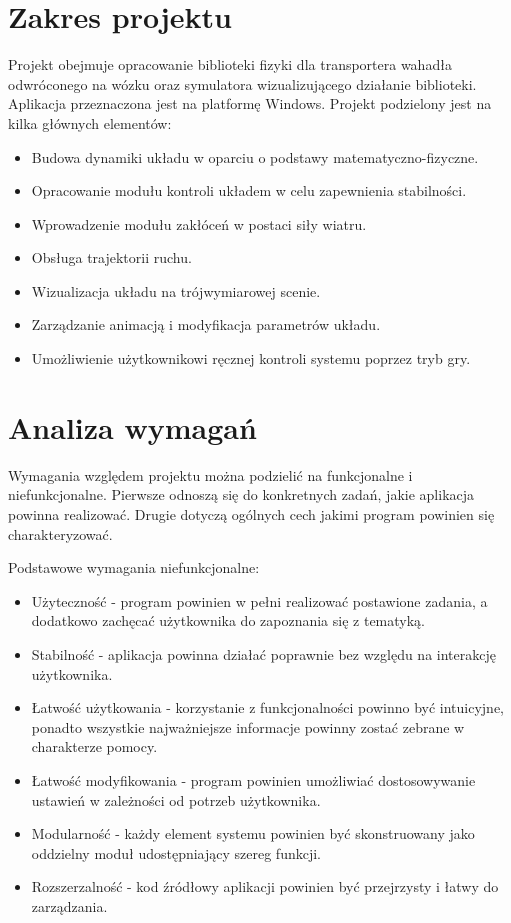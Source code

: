 \documentclass[12pt, twoside, openany]{report}
\theoremstyle{definition}
\begin{document}
\section{Zakres projektu}
Projekt obejmuje opracowanie biblioteki fizyki dla transportera wahadła odwróconego na wózku oraz symulatora wizualizującego działanie biblioteki. Aplikacja przeznaczona jest na platformę Windows. Projekt podzielony jest na kilka głównych elementów:
\begin{itemize}
\item Budowa dynamiki układu w oparciu o podstawy matematyczno-fizyczne.
\item Opracowanie modułu kontroli układem w celu zapewnienia stabilności.
\item Wprowadzenie modułu zakłóceń w postaci siły wiatru.
\item Obsługa trajektorii ruchu.
\item Wizualizacja układu na trójwymiarowej scenie.
\item Zarządzanie animacją i modyfikacja parametrów układu.
\item Umożliwienie użytkownikowi ręcznej kontroli systemu poprzez tryb gry.
\end{itemize}

\section{Analiza wymagań}
Wymagania względem projektu można podzielić na funkcjonalne i niefunkcjonalne. Pierwsze odnoszą się do konkretnych zadań, jakie aplikacja powinna realizować. Drugie dotyczą ogólnych cech jakimi program powinien się charakteryzować.

Podstawowe wymagania niefunkcjonalne:
\begin{itemize}
\item Użyteczność - program powinien w pełni realizować postawione zadania, a dodatkowo zachęcać użytkownika do zapoznania się z tematyką.
\item Stabilność - aplikacja powinna działać poprawnie bez względu na interakcję użytkownika.
\item Łatwość użytkowania - korzystanie z funkcjonalności powinno być intuicyjne, ponadto wszystkie najważniejsze informacje powinny zostać zebrane w charakterze pomocy.
\item Łatwość modyfikowania - program powinien umożliwiać dostosowywanie ustawień w zależności od potrzeb użytkownika. 
\item Modularność - każdy element systemu powinien być skonstruowany jako oddzielny moduł udostępniający szereg funkcji.
\item Rozszerzalność - kod źródłowy aplikacji powinien być przejrzysty i łatwy do zarządzania.
\end{itemize}
\end{document}
